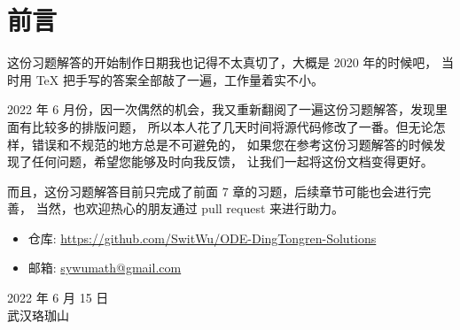 \chapter*{前言}



这份习题解答的开始制作日期我也记得不太真切了，大概是 2020 年的时候吧，
当时用 \TeX{} 把手写的答案全部敲了一遍，工作量着实不小。

2022 年 6 月份，因一次偶然的机会，我又重新翻阅了一遍这份习题解答，发现里面有比较多的排版问题，
所以本人花了几天时间将源代码修改了一番。但无论怎样，错误和不规范的地方总是不可避免的，
如果您在参考这份习题解答的时候发现了任何问题，希望您能够及时向我反馈，
让我们一起将这份文档变得更好。

而且，这份习题解答目前只完成了前面 7 章的习题，后续章节可能也会进行完善，
当然，也欢迎热心的朋友通过 pull request 来进行助力。

\begin{itemize}
  \item 仓库: \url{https://github.com/SwitWu/ODE-DingTongren-Solutions}
  \item 邮箱: \href{mailto:sywumath@gmail.com}{\ttfamily sywumath@gmail.com}
\end{itemize}

\begin{flushright}
  2022 年 6 月 15 日 \\
  武汉珞珈山
\end{flushright}